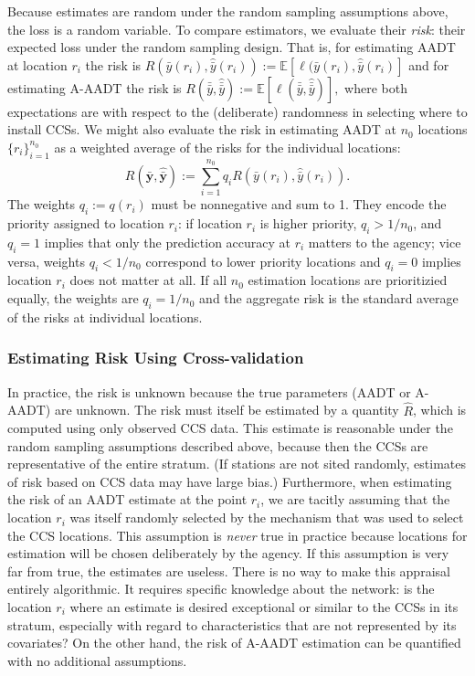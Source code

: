 \documentclass[11pt]{article}
\begin{document}
Because estimates are random under the random sampling assumptions
above, the loss is a random variable. To compare estimators, we evaluate
their \emph{risk}: their expected loss under the random sampling design.
That is, for estimating AADT at location \(r_i\) the risk is
\(R(\bar{y}(r_i), \hat{\bar{y}}(r_i)) := \mathbb{E}[\ell(\bar{y}(r_i), \hat{\bar{y}}(r_i)]\)
and for estimating A-AADT the risk is
\(R(\bar{\bar{y}}, \hat{\bar{\bar{y}}}) := \mathbb{E}[\ell(\bar{\bar{y}}, \hat{\bar{\bar{y}}})],\)
where both expectations are with respect to the (deliberate) randomness
in selecting where to install CCSs. We might also evaluate the risk in
estimating AADT at \(n_0\) locations \(\{r_i\}_{i=1}^{n_0}\) as a
weighted average of the risks for the individual locations:
\[R(\bar{\mathbf{y}}, \hat{\bar{\mathbf{y}}}) := \sum_{i=1}^{n_0} q_i R(\bar{y}(r_i), \hat{\bar{y}}(r_i)).\]
The weights \(q_i := q(r_i)\) must be nonnegative and sum to 1. They
encode the priority assigned to location \(r_i\): if location \(r_i\) is
higher priority, \(q_i > 1/n_0\), and \(q_i = 1\) implies that only the
prediction accuracy at \(r_i\) matters to the agency; vice versa,
weights \(q_i < 1/n_0\) correspond to lower priority locations and
\(q_i = 0\) implies location \(r_i\) does not matter at all. If all
\(n_0\) estimation locations are prioritizied equally, the weights are
\(q_i = 1/n_0\) and the aggregate risk is the standard average of the
risks at individual locations.

\subsubsection{Estimating Risk Using
Cross-validation}\label{estimating-risk-using-cross-validation}

In practice, the risk is unknown because the true parameters (AADT or
A-AADT) are unknown. The risk must itself be estimated by a quantity
\(\hat{R}\), which is computed using only observed CCS data. This
estimate is reasonable under the random sampling assumptions described
above, because then the CCSs are representative of the entire stratum.
(If stations are not sited randomly, estimates of risk based on CCS data
may have large bias.) Furthermore, when estimating the risk of an AADT
estimate at the point \(r_i\), we are tacitly assuming that the location
\(r_i\) was itself randomly selected by the mechanism that was used to
select the CCS locations. This assumption is \emph{never} true in
practice because locations for estimation will be chosen deliberately by
the agency. If this assumption is very far from true, the estimates are
useless. There is no way to make this appraisal entirely algorithmic. It
requires specific knowledge about the network: is the location \(r_i\)
where an estimate is desired exceptional or similar to the CCSs in its
stratum, especially with regard to characteristics that are not
represented by its covariates? On the other hand, the risk of A-AADT
estimation can be quantified with no additional assumptions.
\end{document}
